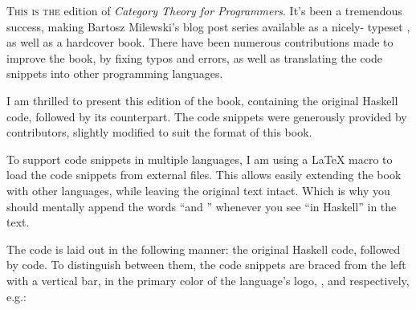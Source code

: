 
\lettrine[lhang=0.17]{T}{his is the} \optlang edition of \emph{Category Theory for Programmers}.
It's been a tremendous success, making Bartosz Milewski's blog post series available as a nicely-
typeset , as well as a hardcover book. There have been numerous contributions made
to improve the book, by fixing typos and errors, as well as translating the code snippets into
other programming languages.

I am thrilled to present this edition of the book, containing the original Haskell code, followed by its
\optlang
counterpart. The \optlang code snippets were generously provided by
\contributors
contributors, slightly modified to suit the format of this book.

To support code snippets in multiple languages, I am using a \LaTeX{} macro to load the code snippets
from external files. This allows easily extending the book with other languages, while leaving the
original text intact. Which is why you should mentally append the words ``and \optlang'' whenever you see
``in Haskell'' in the text.

The code is laid out in the following manner: the original Haskell code, followed by \optlang code.
To distinguish between them, the code snippets are braced from the left with a vertical bar, in the primary
color of the language's logo, ,
and  respectively, e.g.:

\unskip
{}
\NoIndentAfterThis
